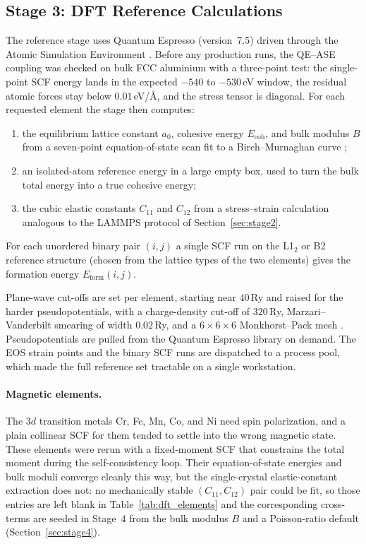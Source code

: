 \subsection{Stage 3: DFT Reference Calculations}
\label{sec:stage3}

The reference stage uses Quantum Espresso \citep{giannozzi2009} (version~7.5)
driven through the Atomic Simulation Environment \citep{ase2017}. Before any
production runs, the QE--ASE coupling was checked on bulk FCC aluminium with a
three-point test: the single-point SCF energy lands in the expected $-540$ to
$-530$\,eV window, the residual atomic forces stay below $0.01$\,eV/\AA, and
the stress tensor is diagonal. For each requested element the stage then
computes:

\begin{enumerate}
	\item the equilibrium lattice constant $a_0$, cohesive energy
	      $E_\mathrm{coh}$, and bulk modulus $B$ from a seven-point
	      equation-of-state scan fit to a Birch--Murnaghan curve
	      \citep{birch};
	\item an isolated-atom reference energy in a large empty box, used to turn
	      the bulk total energy into a true cohesive energy;
	\item the cubic elastic constants $C_{11}$ and $C_{12}$ from a
	      stress--strain calculation analogous to the LAMMPS protocol of
	      Section~\ref{sec:stage2}.
\end{enumerate}
For each unordered binary pair $(i,j)$ a single SCF run on the L1$_2$ or B2
reference structure (chosen from the lattice types of the two elements) gives
the formation energy $E_\mathrm{form}(i,j)$.

Plane-wave cut-offs are set per element, starting near $40$\,Ry and raised for
the harder pseudopotentials, with a charge-density cut-off of $320$\,Ry,
Marzari--Vanderbilt smearing \citep{marzari1999} of width $0.02$\,Ry, and a
$6\!\times\!6\!\times\!6$ Monkhorst--Pack mesh \citep{monkhorst1976}.
Pseudopotentials are pulled from the Quantum Espresso library on demand. The
EOS strain points and the binary SCF runs are dispatched to a process pool,
which made the full reference set tractable on a single workstation.

\paragraph{Magnetic elements.}
The 3$d$ transition metals Cr, Fe, Mn, Co, and Ni need spin polarization, and a
plain collinear SCF for them tended to settle into the wrong magnetic state.
These elements were rerun with a fixed-moment SCF that constrains the total
moment during the self-consistency loop. Their equation-of-state energies and
bulk moduli converge cleanly this way, but the single-crystal elastic-constant
extraction does not: no mechanically stable $(C_{11},C_{12})$ pair could be
fit, so those entries are left blank in Table~\ref{tab:dft_elements} and the
corresponding cross-terms are seeded in Stage~4 from the bulk modulus $B$ and a
Poisson-ratio default (Section~\ref{sec:stage4}).

